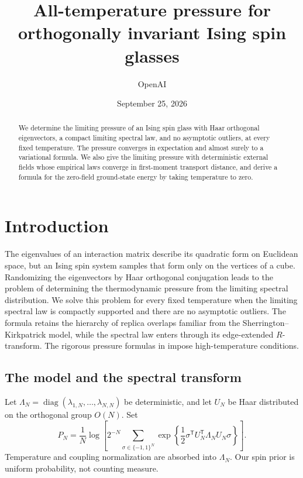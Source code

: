 \documentclass[11pt]{article}
\title{All-temperature pressure for orthogonally invariant Ising spin glasses}
\author{OpenAI}
\date{September 25, 2026}
\theoremstyle{definition}
\theoremstyle{remark}
\numberwithin{equation}{section}
\DeclareMathOperator{\diag}{diag}
\begin{document}
\maketitle
\begin{abstract}
We determine the limiting pressure of an Ising spin glass with Haar
orthogonal eigenvectors, a compact limiting spectral law, and no
asymptotic outliers, at every fixed temperature. The pressure converges
in expectation and almost surely to a variational formula. We also give
the limiting pressure with deterministic external fields whose empirical
laws converge in first-moment transport distance, and derive a formula
for the zero-field ground-state energy by taking temperature to zero.
\end{abstract}

\section{Introduction}
\label{sec:introduction}

The eigenvalues of an interaction matrix describe its quadratic form on
Euclidean space, but an Ising spin system samples that form only on the
vertices of a cube. Randomizing the eigenvectors by Haar orthogonal
conjugation leads to the problem of determining the thermodynamic
pressure from the limiting spectral distribution. We solve this problem
for every fixed temperature when the limiting spectral law is
compactly supported and there are no asymptotic outliers. The formula
retains the hierarchy of replica overlaps familiar from the
Sherrington--Kirkpatrick model, while the spectral law enters through
its edge-extended $R$-transform. The rigorous pressure formulas in
\cite{BhattacharyaSen,FanWu,Fan2026} impose high-temperature conditions.

\subsection{The model and the spectral transform}

Let $\Lambda_N=\diag(\lambda_{1,N},\ldots,\lambda_{N,N})$ be deterministic,
and let $U_N$ be Haar distributed on the orthogonal group $O(N)$. Set
\begin{equation}
 P_N=\frac1N\log\left[
 2^{-N}\sum_{\sigma\in\{-1,1\}^N}
 \exp\left\{\frac12\sigma^{\mathsf T}
 U_N^{\mathsf T}\Lambda_NU_N\sigma\right\}\right].
 \label{eq:pressure}
\end{equation}
Temperature and coupling normalization are absorbed into $\Lambda_N$.
Our spin prior is uniform probability, not counting measure.
\end{document}
